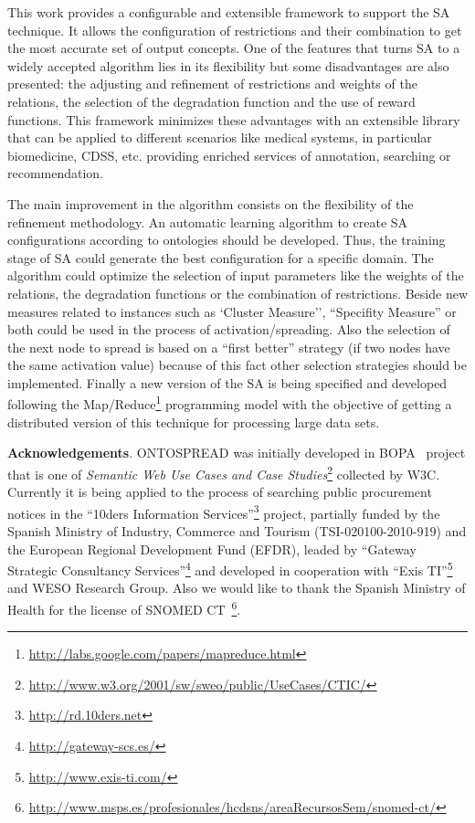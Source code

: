 This work provides a configurable and extensible framework to support the SA technique. It allows
the configuration of restrictions and their combination to get
the most accurate set of output concepts. One of the features that
turns SA to a widely accepted algorithm lies in its flexibility 
but some disadvantages are also presented: the adjusting and refinement of
restrictions and weights of the relations, the selection of the
degradation function and the use of reward functions. This framework
minimizes these advantages with an extensible library that can be
applied to different scenarios like medical systems, in particular
biomedicine, CDSS, etc. providing enriched services
of annotation, searching or recommendation.

The main improvement in the algorithm consists on the flexibility of
the refinement methodology. An automatic learning algorithm to create SA configurations
according to ontologies should be developed. Thus, the training stage of SA could generate
the best configuration for a specific domain. The algorithm could optimize the selection 
of input parameters like the weights of the relations, the degradation functions 
or the combination of restrictions. Beside new measures related to instances such as `Cluster
Measure'', ``Specifity Measure'' or both could be used in the process of activation/spreading.
Also the selection of the next node to spread is based on a ``first
better'' strategy (if two nodes have the same activation value) because of this fact
other selection strategies should be implemented. Finally a new version of the SA
is being specified and developed following the Map/Reduce\footnote{\url{http://labs.google.com/papers/mapreduce.html}} programming model with the objective
of getting a distributed version of this technique for processing large data sets.

\textbf{Acknowledgements}. ONTOSPREAD was initially developed in BOPA~\cite{bopaEstonia} project that is
one of \textit{Semantic Web Use Cases and Case
Studies}\footnote{\url{http://www.w3.org/2001/sw/sweo/public/UseCases/CTIC/}}
collected by W3C. Currently it is being applied to the process of searching
public procurement notices in the ``10ders Information Services''\footnote{\url{http://rd.10ders.net}} project, partially funded by 
the Spanish Ministry of Industry, Commerce and Tourism (TSI-020100-2010-919) 
and the European Regional Development Fund (EFDR), leaded by ``Gateway Strategic Consultancy Services''\footnote{\url{http://gateway-scs.es/}} 
and developed in cooperation with ``Exis TI''\footnote{\url{http://www.exis-ti.com/}}  and WESO Research Group. Also we would like 
to thank the Spanish Ministry of Health for the license of 
SNOMED CT~\footnote{\url{http://www.msps.es/profesionales/hcdsns/areaRecursosSem/snomed-ct/}}. 